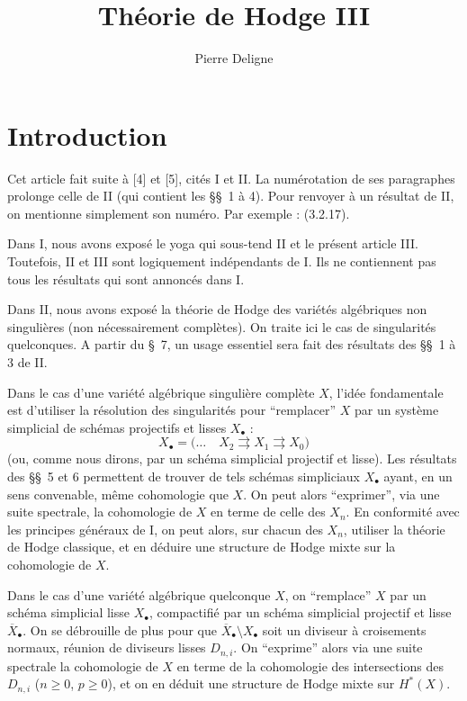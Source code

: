 \documentclass[11pt]{amsart}
\theoremstyle{plain}
\theoremstyle{definition}
\begin{document}
\title[Th\'eorie de Hodge III]{Th\'eorie de Hodge III}
\author{Pierre Deligne}
\maketitle

\section*{Introduction}

Cet article fait suite \`a [4] et [5], cit\'es I et II. La num\'erotation de ses paragraphes
prolonge celle de II (qui contient les \S\S\ 1 \`a 4). Pour renvoyer \`a un r\'esultat de II, on
mentionne simplement son num\'ero. Par exemple : (3.2.17).

Dans I, nous avons expos\'e le yoga qui sous-tend II et le pr\'esent article III. Toutefois,
II et III sont logiquement ind\'ependants de I. Ils ne contiennent pas tous les r\'esultats
qui sont annonc\'es dans I.

Dans II, nous avons expos\'e la th\'eorie de Hodge des vari\'et\'es alg\'ebriques non
singuli\`eres (non n\'ecessairement compl\`etes). On traite ici le cas de singularit\'es quelconques.
A partir du \S\ 7, un usage essentiel sera fait des r\'esultats des \S\S\ 1 \`a 3 de II.

Dans le cas d'une vari\'et\'e alg\'ebrique singuli\`ere compl\`ete $X$, l'id\'ee fondamentale est
d'utiliser la r\'esolution des singularit\'es pour ``remplacer'' $X$ par un syst\`eme simplicial
de sch\'emas projectifs et lisses $X_\bullet$ :
\[
X_\bullet = \Big(\ldots\quad
X_2 \rightrightarrows X_1 \rightrightarrows X_0\Big)
\]
(ou, comme nous dirons, par un sch\'ema simplicial projectif et lisse). Les r\'esultats des
\S\S\ 5 et 6 permettent de trouver de tels sch\'emas simpliciaux $X_\bullet$ ayant, en un sens convenable,
m\^eme cohomologie que $X$. On peut alors ``exprimer'', via une suite spectrale, la cohomologie
de $X$ en terme de celle des $X_n$. En conformit\'e avec les principes g\'en\'eraux de I,
on peut alors, sur chacun des $X_n$, utiliser la th\'eorie de Hodge classique, et en d\'eduire
une structure de Hodge mixte sur la cohomologie de $X$.

Dans le cas d'une vari\'et\'e alg\'ebrique quelconque $X$, on ``remplace'' $X$ par un
sch\'ema simplicial lisse $X_\bullet$, compactifi\'e par un sch\'ema simplicial projectif et lisse $\overline{X}_\bullet$.
On se d\'ebrouille de plus pour que $\overline{X}_\bullet \setminus X_\bullet$ soit un diviseur \`a croisements normaux,
r\'eunion de diviseurs lisses $D_{n,i}$. On ``exprime'' alors via une suite spectrale la cohomologie
de $X$ en terme de la cohomologie des intersections des $D_{n,i}$ ($n\geq 0$, $p\geq 0$), et on en
d\'eduit une structure de Hodge mixte sur $H^*(X)$.
\end{document}
